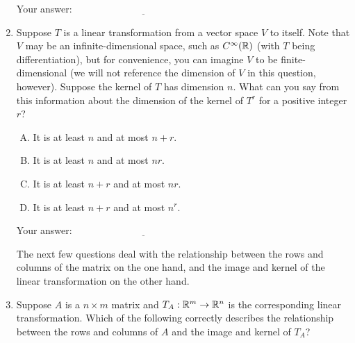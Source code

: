 \documentclass[10pt]{amsart}
\begin{document}
\begin{enumerate}
  \vspace{0.1in}
  Your answer: $\underline{\qquad\qquad\qquad\qquad\qquad\qquad\qquad}$
  \vspace{0.1in}

\item Suppose $T$ is a linear transformation from a vector space $V$
  to itself. Note that $V$ may be an infinite-dimensional space, such
  as $C^\infty(\mathbb{R})$ (with $T$ being differentiation), but for
  convenience, you can imagine $V$ to be finite-dimensional (we will
  not reference the dimension of $V$ in this question,
  however). Suppose the kernel of $T$ has dimension $n$. What can you
  say from this information about the dimension of the kernel of $T^r$
  for a positive integer $r$?

  \begin{enumerate}[(A)]
  \item It is at least $n$ and at most $n + r$.
  \item It is at least $n$ and at most $nr$.
  \item It is at least $n + r$ and at most $nr$.
  \item It is at least $n + r$ and at most $n^r$.
  \end{enumerate}

  \vspace{0.1in}
  Your answer: $\underline{\qquad\qquad\qquad\qquad\qquad\qquad\qquad}$
  \vspace{0.5in}

  The next few questions deal with the relationship between the rows
  and columns of the matrix on the one hand, and the image and kernel
  of the linear transformation on the other hand.

\item Suppose $A$ is a $n \times m$ matrix and $T_A: \mathbb{R}^m \to \mathbb{R}^n$ is
  the corresponding linear transformation. Which of the following
  correctly describes the relationship between the rows and columns of
  $A$ and the image and kernel of $T_A$?


\end{enumerate}
\end{document}
